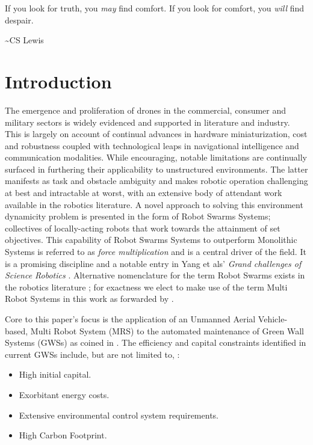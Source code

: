 \documentclass{report}
\begin{document}
\newpage
{}
\vspace*{\fill}
{{\Large
If you look for truth, you \textit{may} find comfort.
If you look for comfort, you \textit{will} find despair.

\begin{flushright}
	\textasciitilde CS Lewis
\end{flushright}
}}
\vspace*{\fill}

\chapter{Introduction}

The emergence and proliferation of drones in the commercial, consumer and military sectors is widely evidenced and supported in literature and industry. This is largely on account of continual advances in hardware miniaturization, cost and robustness coupled with technological leaps in navigational intelligence and communication modalities. While encouraging, notable limitations are continually surfaced in furthering their applicability to unstructured environments. The latter manifests as task and obstacle ambiguity and makes robotic operation challenging at best and intractable at worst, with an extensive body of attendant work available in the robotics literature. A novel approach to solving this environment dynamicity problem is presented in the form of Robot Swarms Systems; collectives of locally-acting robots that work towards the attainment of set objectives. This capability of Robot Swarms Systems to outperform Monolithic Systems is referred to as \textit{force multiplication} \cite{Yang2018} and is a central driver of the field. It is a promising discipline and a notable entry in Yang et als' \textit{Grand challenges of Science Robotics} \cite{Yang2018}. Alternative nomenclature for the term Robot Swarms exists in the robotics literature \cite{Beni2005a} \cite{Sahin2005} \cite{Iocchi2001}; for exactness we elect to make use of the term Multi Robot Systems in this work as forwarded by \cite{Iocchi2001}.

Core to this paper's focus is the application of an Unmanned Aerial Vehicle-based, Multi Robot System (MRS) to the automated maintenance of Green Wall Systems (GWSs) as coined in \cite{Perini2011}. The efficiency and capital constraints identified in current GWSs include, but are not limited to, \cite{Holt2018}:
\begin{itemize}
	\item High initial capital.
	\item Exorbitant energy costs.
	\item Extensive environmental control system requirements.
	\item High Carbon Footprint.
\end{itemize}
\end{document}
